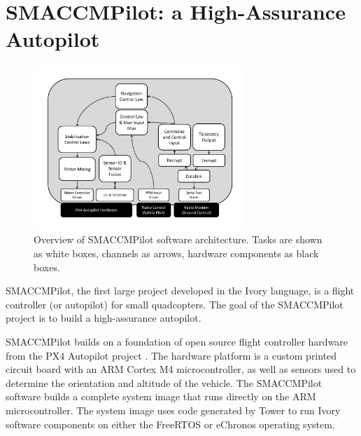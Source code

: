 \section{SMACCMPilot: a High-Assurance Autopilot}
\label{sec:smaccmpilot}

\begin{figure}
  \begin{center}
\includegraphics[width=8cm]{figures/smaccmpilot-diagram-jan14}
  \end{center}
\caption[SMACCMPilot software architecture]{Overview of SMACCMPilot
software architecture. Tasks are shown as white boxes, channels as arrows,
hardware components as black boxes.}
\label{fig:smaccmpilotSwArch}
\end{figure}


SMACCMPilot, the first large project
developed in the Ivory language, is a flight controller (or autopilot) for small
quadcopters. The goal of the SMACCMPilot project is to build a high-assurance
autopilot.

SMACCMPilot builds on a foundation of open source flight controller hardware
from the PX4 Autopilot project . The hardware platform is a
custom printed circuit board with an ARM Cortex M4 microcontroller, as well as
sensors used to determine the orientation and altitude of the vehicle.
 The
SMACCMPilot software builds a complete system image that runs directly on the
ARM microcontroller. The system image uses code generated by Tower to run Ivory
software components on either the FreeRTOS or eChronos operating system.

